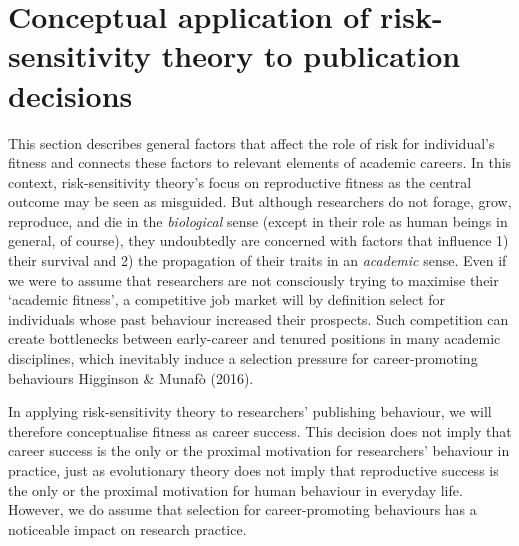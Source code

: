 \documentclass[
  ,man,mask,floatsintext]{apa6}
\begin{document}
\hypertarget{conceptual-application-of-risk-sensitivity-theory-to-publication-decisions}{%
\section{Conceptual application of risk-sensitivity theory to publication decisions}\label{conceptual-application-of-risk-sensitivity-theory-to-publication-decisions}}

This section describes general factors that affect the role of risk for individual's fitness and connects these factors to relevant elements of academic careers.
In this context, risk-sensitivity theory's focus on reproductive fitness as the central outcome may be seen as misguided.
But although researchers do not forage, grow, reproduce, and die in the \emph{biological} sense (except in their role as human beings in general, of course), they undoubtedly are concerned with factors that influence 1) their survival and 2) the propagation of their traits in an \emph{academic} sense.
Even if we were to assume that researchers are not consciously trying to maximise their `academic fitness', a competitive job market will by definition select for individuals whose past behaviour increased their prospects.
Such competition can create bottlenecks between early-career and tenured positions in many academic disciplines, which inevitably induce a selection pressure for career-promoting behaviours Higginson \& Munafò (2016).

In applying risk-sensitivity theory to researchers' publishing behaviour, we will therefore conceptualise fitness as career success.
This decision does not imply that career success is the only or the proximal motivation for researchers' behaviour in practice, just as evolutionary theory does not imply that reproductive success is the only or the proximal motivation for human behaviour in everyday life.
However, we do assume that selection for career-promoting behaviours has a noticeable impact on research practice.
\end{document}

